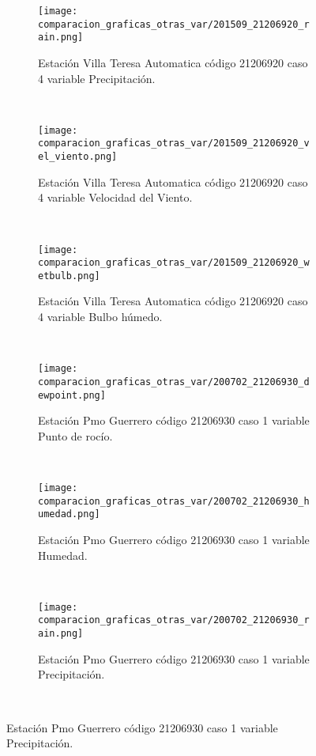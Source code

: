 \begin{figure}[H]
\centering
\begin{subfigure}[normla]{0.4\textwidth}
\caption{Estación Villa Teresa Automatica código 21206920 caso 4 variable Precipitación.}
\texttt{[image: comparacion\_graficas\_otras\_var/201509\_21206920\_rain.png]}
\end{subfigure}
~
\begin{subfigure}[normla]{0.4\textwidth}
\caption{Estación Villa Teresa Automatica código 21206920 caso 4 variable Velocidad del Viento.}
\texttt{[image: comparacion\_graficas\_otras\_var/201509\_21206920\_vel\_viento.png]}
\end{subfigure}
~
\begin{subfigure}[normla]{0.4\textwidth}
\caption{Estación Villa Teresa Automatica código 21206920 caso 4 variable Bulbo húmedo.}
\texttt{[image: comparacion\_graficas\_otras\_var/201509\_21206920\_wetbulb.png]}
\end{subfigure}
~
\begin{subfigure}[normla]{0.4\textwidth}
\caption{Estación Pmo Guerrero código 21206930 caso 1 variable Punto de rocío.}
\texttt{[image: comparacion\_graficas\_otras\_var/200702\_21206930\_dewpoint.png]}
\end{subfigure}
~
\begin{subfigure}[normla]{0.4\textwidth}
\caption{Estación Pmo Guerrero código 21206930 caso 1 variable Humedad.}
\texttt{[image: comparacion\_graficas\_otras\_var/200702\_21206930\_humedad.png]}
\end{subfigure}
~
\begin{subfigure}[normla]{0.4\textwidth}
\caption{Estación Pmo Guerrero código 21206930 caso 1 variable Precipitación.}
\texttt{[image: comparacion\_graficas\_otras\_var/200702\_21206930\_rain.png]}
\end{subfigure}
~
\end{figure}
           
